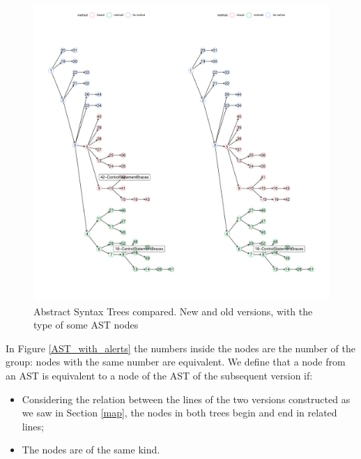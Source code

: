 \documentclass[
]{article}
\begin{document}
%
%


\begin{figure}[H]
\includegraphics[width=1\linewidth]{report_files/figure-latex/unnamed-chunk-3-1} \caption{Abstract Syntax Trees compared. New and old versions, with the type of some AST nodes \label{AST_compare}}\label{fig:unnamed-chunk-3}
\end{figure}



In Figure \ref{AST_with_alerts} the numbers inside the nodes are the
number of the group: nodes with the same number are equivalent. We
define that a node from an AST is equivalent to a node of the AST of the
subsequent version if:

\begin{itemize}
\item
  Considering the relation between the lines of the two versions
  constructed as we saw in Section \ref{map}, the nodes in both trees
  begin and end in related lines;
  
%
%
  
\item
  The nodes are of the same kind.
\end{itemize}
\end{document}
